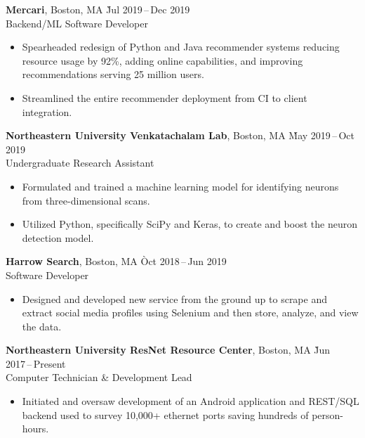 \documentclass[11pt]{article}
\newcommand{\ressection}[1]{%
  \vspace{12pt}{\Large{\textsc{#1}}} \titlerule[0.5pt] \par
}
\begin{document}
\ressection{Work Experience}

\begin{tabbing}
  \textbf{Mercari}, Boston, MA \` Jul 2019\,--\,Dec 2019 \\
  Backend/ML Software Developer
\end{tabbing}
\begin{itemize}
  \item Spearheaded redesign of Python and Java recommender systems reducing resource usage by 92\%, adding online capabilities, and improving recommendations serving 25 million users.
  \item Streamlined the entire recommender deployment from CI to client integration.
\end{itemize}

\begin{tabbing}
  \textbf{Northeastern University Venkatachalam Lab}, Boston, MA \` May 2019\,--\,Oct 2019 \\
  Undergraduate Research Assistant
\end{tabbing}
\begin{itemize}
  \item Formulated and trained a machine learning model for identifying neurons from three-dimensional scans.
  \item Utilized Python, specifically SciPy and Keras, to create and boost the neuron detection model.
\end{itemize}

\begin{tabbing}
  \textbf{Harrow Search}, Boston, MA \` Oct 2018\,--\,Jun 2019 \\
  Software Developer
\end{tabbing}
\begin{itemize}
  \item Designed and developed new service from the ground up to scrape and extract social media profiles using Selenium and then store, analyze, and view the data.
\end{itemize}

\begin{tabbing}
  \textbf{Northeastern University ResNet Resource Center}, Boston, MA \` Jun 2017\,--\,Present \\
  Computer Technician \& Development Lead
\end{tabbing}
\begin{itemize}
  \item Initiated and oversaw development of an Android application and REST/SQL backend used to survey 10,000+ ethernet ports saving hundreds of person-hours.
\end{itemize}
\end{document}
